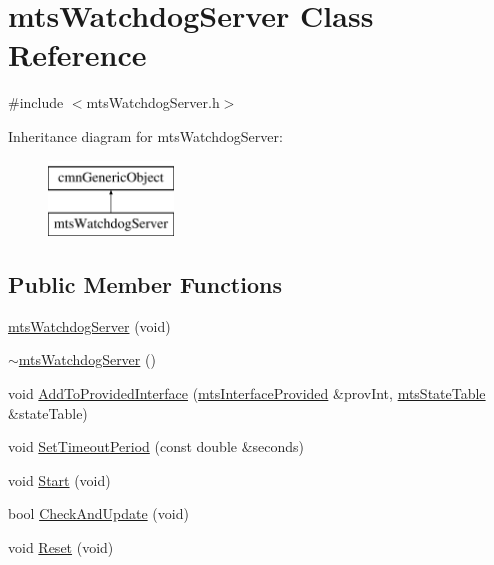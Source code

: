 \hypertarget{classmts_watchdog_server}{\section{mts\-Watchdog\-Server Class Reference}
\label{classmts_watchdog_server}
}


{\ttfamily \#include $<$mts\-Watchdog\-Server.\-h$>$}

Inheritance diagram for mts\-Watchdog\-Server\-:\begin{figure}[H]
\begin{center}
\leavevmode
\includegraphics[height=2.000000cm]{d8/d6b/classmts_watchdog_server}
\end{center}
\end{figure}
\subsection*{Public Member Functions}
\begin{DoxyCompactItemize}
\item 
\hyperlink{classmts_watchdog_server_a9bc1b697c5232ce27b23e0b95d13dd87}{mts\-Watchdog\-Server} (void)
\item 
\hyperlink{classmts_watchdog_server_a194412bb759ee19f6b6f62d225cc3aa8}{$\sim$mts\-Watchdog\-Server} ()
\item 
void \hyperlink{classmts_watchdog_server_a46c5ade74f1d78e88eb30bc701a71d51}{Add\-To\-Provided\-Interface} (\hyperlink{classmts_interface_provided}{mts\-Interface\-Provided} \&prov\-Int, \hyperlink{classmts_state_table}{mts\-State\-Table} \&state\-Table)
\item 
void \hyperlink{classmts_watchdog_server_a4b7c34c079cdd8f7c5a934deb201f19c}{Set\-Timeout\-Period} (const double \&seconds)
\item 
void \hyperlink{classmts_watchdog_server_a8d94906b47c0f6cdd0bb6bf96f7dac3d}{Start} (void)
\item 
bool \hyperlink{classmts_watchdog_server_a45a726d4c07743456fc860a91394e24d}{Check\-And\-Update} (void)
\item 
void \hyperlink{classmts_watchdog_server_a74fd0e35e3ffc32273fb705420634266}{Reset} (void)
\end{DoxyCompactItemize}

